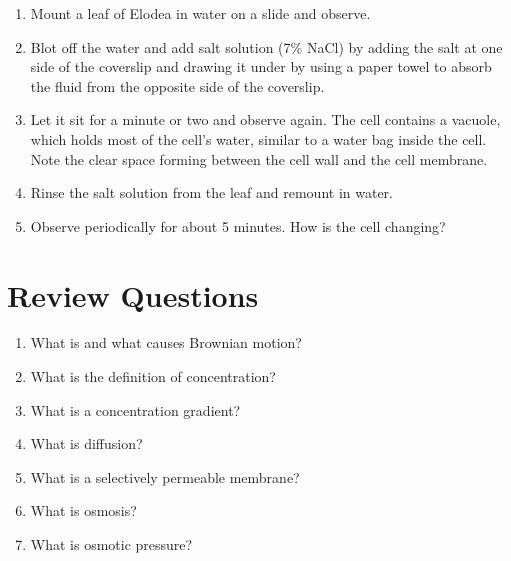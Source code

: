 \begin{enumerate}
\def\labelenumi{\arabic{enumi}.}
\tightlist
\item
  Mount a leaf of Elodea in water on a slide and observe.
\item
  Blot off the water and add salt solution (7\% NaCl) by adding the salt
  at one side of the coverslip and drawing it under by using a paper
  towel to absorb the fluid from the opposite side of the coverslip.
\item
  Let it sit for a minute or two and observe again. The cell contains a
  vacuole, which holds most of the cell's water, similar to a water bag
  inside the cell. Note the clear space forming between the cell wall
  and the cell membrane.
\item
  Rinse the salt solution from the leaf and remount in water.
\item
  Observe periodically for about 5 minutes. How is the cell changing?
\end{enumerate}

\section{Review Questions}\label{review-questions-3}

\begin{enumerate}
\def\labelenumi{\arabic{enumi}.}
\tightlist
\item
  What is and what causes Brownian motion?
\item
  What is the definition of concentration?
\item
  What is a concentration gradient?
\item
  What is diffusion?
\item
  What is a selectively permeable membrane?
\item
  What is osmosis?
\item
  What is osmotic pressure?
\end{enumerate}
